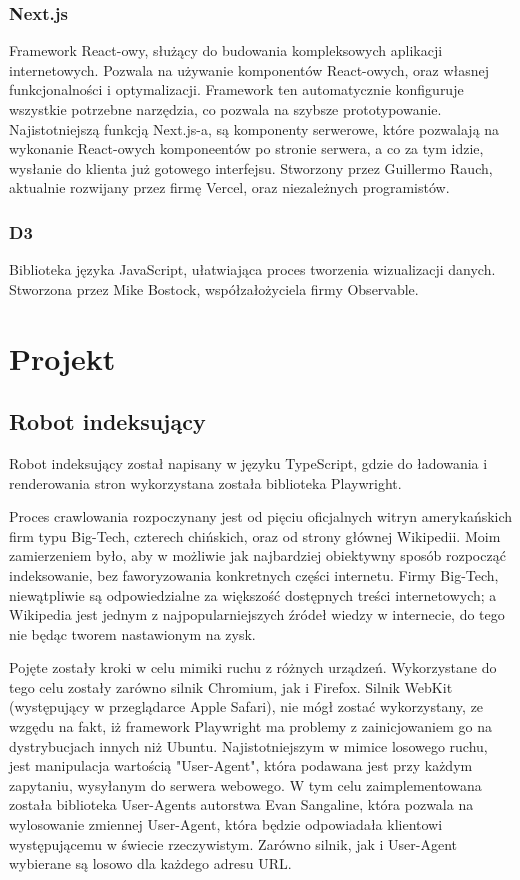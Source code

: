 \documentclass[a4paper, 12pt]{article}
\begin{document}
\subsubsection{Next.js}
Framework React-owy, służący do budowania kompleksowych aplikacji internetowych. Pozwala na używanie komponentów React-owych, oraz własnej funkcjonalności i optymalizacji. Framework ten automatycznie konfiguruje wszystkie potrzebne narzędzia, co pozwala na szybsze prototypowanie. Najistotniejszą funkcją Next.js-a, są komponenty serwerowe, które pozwalają na wykonanie React-owych komponeentów po stronie serwera, a co za tym idzie, wysłanie do klienta już gotowego interfejsu.\cite{introNextjs} Stworzony przez Guillermo Rauch\cite{githubNextjsInit}, aktualnie rozwijany przez firmę Vercel, oraz niezależnych programistów.\cite{githubNextjsContributors}
\subsubsection{D3}
Biblioteka języka JavaScript, ułatwiająca proces tworzenia wizualizacji danych.\cite{homeD3} Stworzona przez Mike Bostock, współzałożyciela firmy Observable.\cite{githubD3Init}

\section{Projekt}
\subsection{Robot indeksujący}
Robot indeksujący został napisany w języku TypeScript, gdzie do ładowania i renderowania stron wykorzystana została biblioteka Playwright.

Proces crawlowania rozpoczynany jest od pięciu oficjalnych witryn amerykańskich firm typu Big-Tech, czterech chińskich, oraz od strony głównej Wikipedii. Moim zamierzeniem było, aby w możliwie jak najbardziej obiektywny sposób rozpocząć indeksowanie, bez faworyzowania konkretnych części internetu. Firmy Big-Tech, niewątpliwie są odpowiedzialne za większość dostępnych treści internetowych; a Wikipedia jest jednym z najpopularniejszych źródeł wiedzy w internecie, do tego nie będąc tworem nastawionym na zysk.

Pojęte zostały kroki w celu mimiki ruchu z różnych urządzeń. Wykorzystane do tego celu zostały zarówno silnik Chromium, jak i Firefox. Silnik WebKit (występujący w przeglądarce Apple Safari), nie mógł zostać wykorzystany, ze wzgędu na fakt, iż framework Playwright ma problemy z zainicjowaniem go na dystrybucjach innych niż Ubuntu.\cite{playwrightWebkitIssue} Najistotniejszym w mimice losowego ruchu, jest manipulacja wartością "User-Agent", która podawana jest przy każdym zapytaniu, wysyłanym do serwera webowego. W tym celu zaimplementowana została biblioteka User-Agents autorstwa Evan Sangaline, która pozwala na wylosowanie zmiennej User-Agent, która będzie odpowiadała klientowi występującemu w świecie rzeczywistym. Zarówno silnik, jak i User-Agent wybierane są losowo dla każdego adresu URL.
\end{document}
